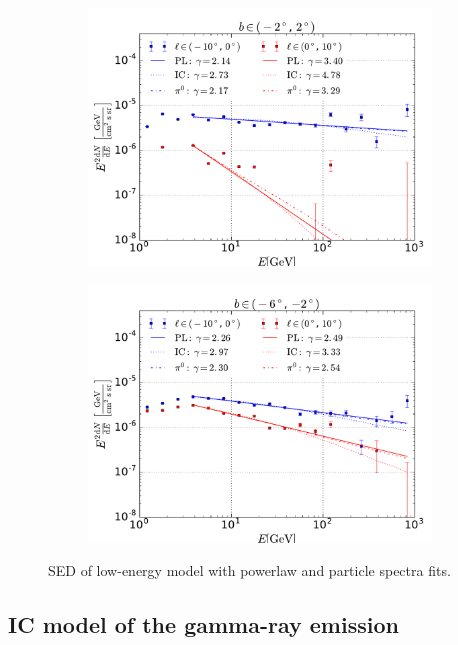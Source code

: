 \begin{figure}[h!]
    \begin{subfigure}{0.5\textwidth}
        \includegraphics[width=\textwidth]{plots/SED_lowE_source_0.pdf}
    \end{subfigure} 
    \begin{subfigure}{0.5\textwidth}
        \includegraphics[width=\textwidth]{plots/SED_lowE_source_-4.pdf}
    \end{subfigure}
  	\caption{SED of low-energy model with powerlaw and particle spectra fits.}
  	\label{fig:SED_with_fits}
\end{figure}




\subsection{IC model of the gamma-ray emission}
\label{sec:IC_model}

